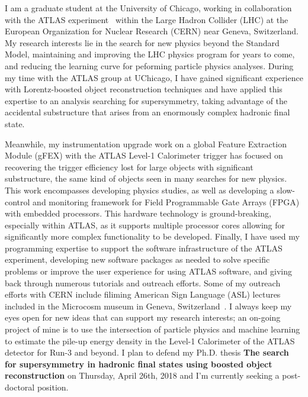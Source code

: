 \documentclass[letterpaper, 11pt]{article}
\begin{document}
\pagestyle{fancy}

I am a graduate student at the University of Chicago, working in collaboration with the ATLAS experiment~ within the Large Hadron Collider (LHC) at the European Organization for Nuclear Research (CERN) near Geneva, Switzerland. My research interests lie in the search for new physics beyond the Standard Model, maintaining and improving the LHC physics program for years to come, and reducing the learning curve for peforming particle physics analyses. During my time with the ATLAS group at UChicago, I have gained significant experience with Lorentz-boosted object reconstruction techniques and have applied this expertise to an analysis searching for supersymmetry, taking advantage of the accidental substructure that arises from an enormously complex hadronic final state.

Meanwhile, my instrumentation upgrade work on a global Feature Extraction Module (gFEX) with the ATLAS Level-1 Calorimeter trigger has focused on recovering the trigger efficiency lost for large objects with significant substructure, the same kind of objects seen in many searches for new physics. This work encompasses developing physics studies, as well as developing a slow-control and monitoring framework for Field Programmable Gate Arrays (FPGA) with embedded processors. This hardware technology is ground-breaking, especially within ATLAS, as it supports multiple processor cores allowing for significantly more complex functionality to be developed. Finally, I have used my programming expertise to support the software infrastructure of the ATLAS experiment, developing new software packages as needed to solve specific problems or improve the user experience for using ATLAS software, and giving back through numerous tutorials and outreach efforts. Some of my outreach efforts with CERN include filiming American Sign Language (ASL) lectures included in the Microcosm museum in Geneva, Switzerland~. I always keep my eyes open for new ideas that can support my research interests; an on-going project of mine is to use the intersection of particle physics and machine learning to estimate the pile-up energy density in the Level-1 Calorimeter of the ATLAS detector for Run-3 and beyond. I plan to defend my Ph.D. thesis \textbf{The search for supersymmetry in hadronic final states using boosted object reconstruction} on Thursday, April 26th, 2018 and I'm currently seeking a post-doctoral position.

\end{document}
